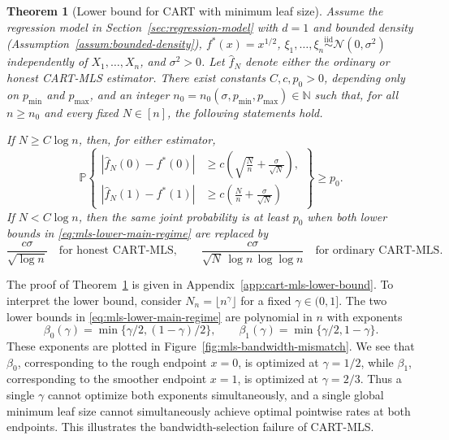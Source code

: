 \documentclass[11pt]{article}
\theoremstyle{plain}
\newtheorem{theorem}{Theorem}[section]
\theoremstyle{definition}
\theoremstyle{remark}
\theoremstyle{plain}
\renewcommand{\P}{\mathbb{P}}
\newcommand{\1}{\mathbbm{1}}
\begin{document}
\begin{theorem}[Lower bound for CART with minimum leaf size]
\label{thm::lowerright}
Assume the regression model in Section~\ref{sec:regression-model} with
$d=1$ and bounded density (Assumption~\ref{assum:bounded-density}),
$f^*(x)=x^{1/2}$, $\xi_1, \ldots, \xi_n \stackrel{\mathrm{iid}}{\sim}
\mathcal N(0, \sigma^2)$ independently of $X_1,\ldots,X_n$, and $\sigma^2>0$.
Let $\widehat f_N$ denote either the ordinary or honest CART-MLS estimator.
There exist constants $C,c,p_0>0$, depending only on
$p_{\min}$ and $p_{\max}$, and an integer
$n_0=n_0(\sigma,p_{\min},p_{\max})\in\mathbb{N}$ such that, for all
$n\ge n_0$ and every fixed $N\in[n]$, the following statements hold.

If $N\ge C\log n$, then, for either estimator,
\begin{equation}\label{eq:mls-lower-main-regime}
\P\left\{
\begin{aligned}
|\widehat f_N(0)-f^*(0)|
&\ge c\left(\sqrt{\frac{N}{n}}+\frac{\sigma}{\sqrt N}\right),\\
|\widehat f_N(1)-f^*(1)|
&\ge c\left(\frac{N}{n}+\frac{\sigma}{\sqrt N}\right)
\end{aligned}
\right\}
\ge p_0.
\end{equation}
If $N<C\log n$, then the same joint probability is at least $p_0$ when
both lower bounds in \eqref{eq:mls-lower-main-regime} are replaced by
\begin{equation}\label{eq:mls-lower-small-regime}
\frac{c\sigma}{\sqrt{\log n}}
\quad\text{for honest CART-MLS},
\qquad
\frac{c\sigma}{\sqrt N\,\log n\,\log\log n}
\quad\text{for ordinary CART-MLS}.
\end{equation}
\end{theorem}

The proof of Theorem~\ref{thm::lowerright} is given in
Appendix~\ref{app:cart-mls-lower-bound}.
To interpret the lower bound, consider $N_n=\lfloor n^\gamma\rfloor$ for a fixed
$\gamma\in(0,1]$. The two lower bounds in \eqref{eq:mls-lower-main-regime} are polynomial in $n$ with exponents
\[
    \beta_0(\gamma)=\min\{\gamma/2,(1-\gamma)/2\},
    \qquad
    \beta_1(\gamma)=\min\{\gamma/2,1-\gamma\}.
\]
These exponents are plotted in
Figure~\ref{fig:mls-bandwidth-mismatch}.
We see that $\beta_0$, corresponding to the rough endpoint $x=0$, is optimized at $\gamma=1/2$, while $\beta_1$, corresponding to the smoother endpoint $x=1$, is optimized at $\gamma=2/3$. Thus a single $\gamma$ cannot optimize both exponents simultaneously, and a single global minimum leaf size cannot simultaneously achieve optimal pointwise rates at both endpoints. This illustrates the bandwidth-selection failure of CART-MLS.
\end{document}
